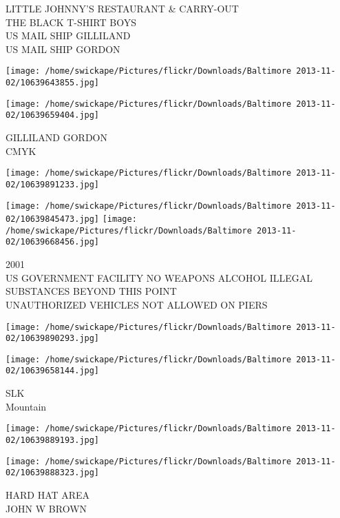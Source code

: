 \documentclass[10pt,letterpaper]{article}
\begin{document}
LITTLE JOHNNY'S RESTAURANT \& CARRY{-}OUT\\
THE BLACK T{-}SHIRT BOYS\\
US MAIL SHIP GILLILAND\\
US MAIL SHIP GORDON\\
\pagebreak

\texttt{[image: /home/swickape/Pictures/flickr/Downloads/Baltimore 2013-11-02/10639643855.jpg]}

\vspace{0.25in}
\texttt{[image: /home/swickape/Pictures/flickr/Downloads/Baltimore 2013-11-02/10639659404.jpg]}

GILLILAND GORDON\\
CMYK\\
\pagebreak

\texttt{[image: /home/swickape/Pictures/flickr/Downloads/Baltimore 2013-11-02/10639891233.jpg]}

\vspace{0.25in}
\texttt{[image: /home/swickape/Pictures/flickr/Downloads/Baltimore 2013-11-02/10639845473.jpg]}
\texttt{[image: /home/swickape/Pictures/flickr/Downloads/Baltimore 2013-11-02/10639668456.jpg]}

2001\\
US GOVERNMENT FACILITY NO WEAPONS ALCOHOL ILLEGAL SUBSTANCES BEYOND THIS POINT\\
UNAUTHORIZED VEHICLES NOT ALLOWED ON PIERS\\
\pagebreak

\texttt{[image: /home/swickape/Pictures/flickr/Downloads/Baltimore 2013-11-02/10639890293.jpg]}

\vspace{0.25in}
\texttt{[image: /home/swickape/Pictures/flickr/Downloads/Baltimore 2013-11-02/10639658144.jpg]}

SLK\\
Mountain\\
\pagebreak

\texttt{[image: /home/swickape/Pictures/flickr/Downloads/Baltimore 2013-11-02/10639889193.jpg]}

\vspace{0.25in}
\texttt{[image: /home/swickape/Pictures/flickr/Downloads/Baltimore 2013-11-02/10639888323.jpg]}

HARD HAT AREA\\
JOHN W BROWN\\
\pagebreak
\end{document}
